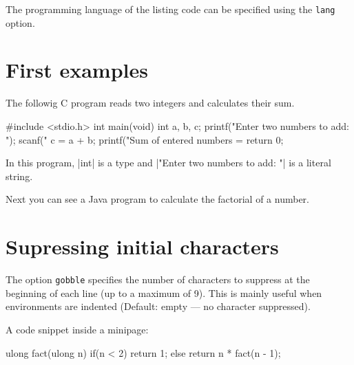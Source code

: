 \documentclass[10pt,a4paper]{article}
\begin{document}
The programming language of the listing code can be specified using the
\verb|lang| option.

\section{First examples}

The followig C program reads two integers and calculates their sum.

\begin{Example}
\begin{pygmented}[lang=c]
#include <stdio.h>
int main(void)
{
   int a, b, c;
   printf("Enter two numbers to add: ");
   scanf("%
   c = a + b;
   printf("Sum of entered numbers = %
   return 0;
}
\end{pygmented}
\end{Example}

\begin{Example}
  In this program, \pyginline[lang=c]|int| is a type and
  \pyginline[lang=c]|"Enter two numbers to add: "| is a literal string.
\end{Example}

Next you can see a Java program to calculate the factorial of a number.

\begin{Example}
\end{Example}

\section{Supressing initial characters}

The option \verb|gobble| specifies the number of characters to suppress
at the beginning of each line (up to a maximum of 9). This is mainly
useful when environments are indented (Default: empty — no character
suppressed).

\begin{Example}
A code snippet inside a minipage:
\begin{minipage}[t]{.5\linewidth}
    \begin{pygmented}[lang=d,gobble=8]
        ulong fact(ulong n)
        {
          if(n < 2)
            return 1;
          else
            return n * fact(n - 1);
        }
      \end{pygmented}
\end{minipage}
\end{Example}
\end{document}
